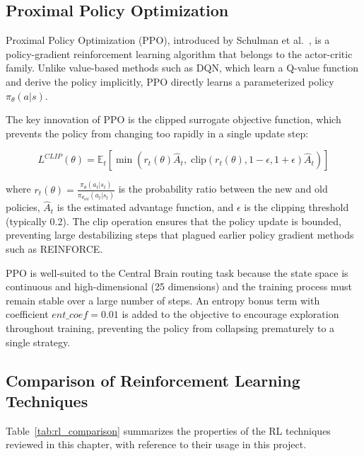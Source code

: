 \subsection{Proximal Policy Optimization}

Proximal Policy Optimization (PPO), introduced by Schulman et al.\ \cite{schulman2017},
is a policy-gradient reinforcement learning algorithm that belongs to the
actor-critic family. Unlike value-based methods such as DQN, which learn a Q-value
function and derive the policy implicitly, PPO directly learns a parameterized
policy $\pi_\theta(a | s)$.

The key innovation of PPO is the clipped surrogate objective function, which
prevents the policy from changing too rapidly in a single update step:

\begin{equation}
    L^{CLIP}(\theta) = \mathbb{E}_t \left[ \min \left( r_t(\theta) \hat{A}_t, \;
    \text{clip}(r_t(\theta), 1 - \epsilon, 1 + \epsilon) \hat{A}_t \right) \right]
\end{equation}

where $r_t(\theta) = \frac{\pi_\theta(a_t | s_t)}{\pi_{\theta_{old}}(a_t | s_t)}$
is the probability ratio between the new and old policies, $\hat{A}_t$ is the
estimated advantage function, and $\epsilon$ is the clipping threshold (typically
0.2). The clip operation ensures that the policy update is bounded, preventing
large destabilizing steps that plagued earlier policy gradient methods such as
REINFORCE.

PPO is well-suited to the Central Brain routing task because the state space is
continuous and high-dimensional (25 dimensions) and the training process must
remain stable over a large number of steps. An entropy bonus term with coefficient
$ent\_coef = 0.01$ is added to the objective to encourage exploration throughout
training, preventing the policy from collapsing prematurely to a single strategy.

\subsection{Comparison of Reinforcement Learning Techniques}

Table~\ref{tab:rl_comparison} summarizes the properties of the RL techniques
reviewed in this chapter, with reference to their usage in this project.

